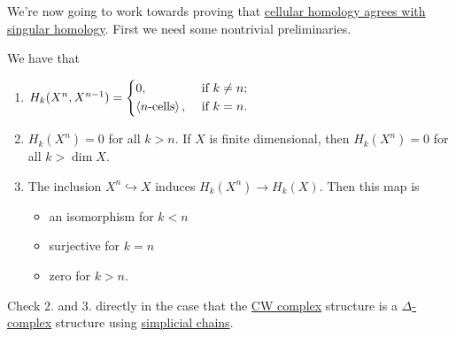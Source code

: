 We're now going to work towards proving that \hyperref[thm:cellular-homology-agrees-with-singular-homology]{cellular homology agrees with singular homology}.
First we need some nontrivial preliminaries.
\begin{lemma}\label{lma:lec-34}
	We have that
	\begin{enumerate}
		\item \(H_k(X^n, X^{n - 1}) = \begin{dcases}
			      0,                             & \text{ if } k\neq n ; \\
			      \left< n\text{-cells}\right> , & \text{ if } k=n .
		      \end{dcases}\)
		\item \(H_k(X^n) = 0\) for all \(k > n\). If \(X\) is finite dimensional, then \(H_k(X^n) = 0\) for all \(k > \dim X\).
		\item The inclusion \(X^n \hookrightarrow X\) induces \(H_k(X^n) \to H_k(X)\). Then this map is
		      \begin{itemize}
			      \item an isomorphism for \(k < n\)
			      \item surjective for \(k = n\)
			      \item zero for \(k > n\).
		      \end{itemize}
	\end{enumerate}
\end{lemma}
\begin{exercise}
	Check 2. and 3. directly in the case that the \hyperref[def:CW-Complex]{CW complex} structure is a \hyperref[def:delta-complex]{\(\Delta\)-complex}
	structure using \hyperref[def:simplicial-chain-group]{simplicial chains}.
\end{exercise}
